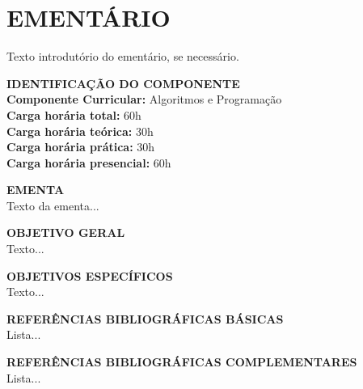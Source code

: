 
\chapter{EMENTÁRIO}
Texto introdutório do ementário, se necessário.

\vspace{0.5cm}
\noindent\textbf{IDENTIFICAÇÃO DO COMPONENTE}\\
\textbf{Componente Curricular:} Algoritmos e Programação\\
\textbf{Carga horária total:} 60h\\
\textbf{Carga horária teórica:} 30h\\
\textbf{Carga horária prática:} 30h\\
\textbf{Carga horária presencial:} 60h

\vspace{0.3cm}
\noindent\textbf{EMENTA}\\
Texto da ementa...

\vspace{0.3cm}
\noindent\textbf{OBJETIVO GERAL}\\
Texto...

\vspace{0.3cm}
\noindent\textbf{OBJETIVOS ESPECÍFICOS}\\
Texto...

\vspace{0.3cm}
\noindent\textbf{REFERÊNCIAS BIBLIOGRÁFICAS BÁSICAS}\\
Lista...

\vspace{0.3cm}
\noindent\textbf{REFERÊNCIAS BIBLIOGRÁFICAS COMPLEMENTARES}\\
Lista...

\vspace{1cm}
